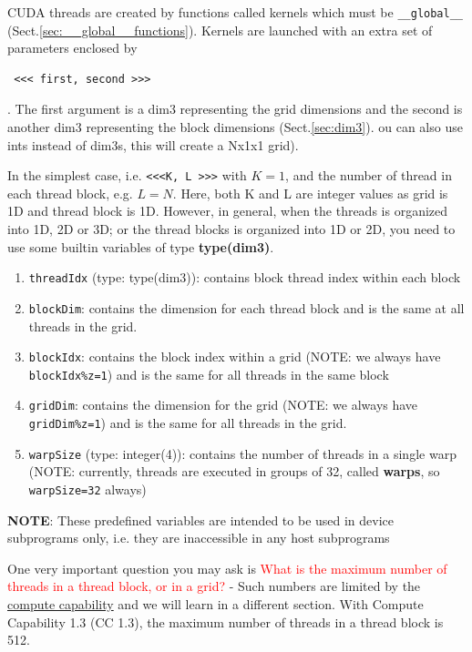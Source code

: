 CUDA threads are created by functions called kernels which must be
\verb!__global__! (Sect.\ref{sec:__global__functions}).
Kernels are launched with an extra set of parameters enclosed by
\begin{verbatim}
 <<< first, second >>>
\end{verbatim}.
The first argument is a dim3 representing the grid dimensions and the second is
another dim3 representing the block dimensions (Sect.\ref{sec:dim3}).
ou can also use ints instead of dim3s, this will create a Nx1x1 grid).



In the simplest case, i.e. \verb.<<<K, L >>>. with $K=1$, and the number of
thread in each thread block, e.g. $L=N$. Here, both K and L are integer values
as grid is 1D and thread block is 1D. However, in general, when the threads is
organized into 1D, 2D or 3D; or the thread blocks is organized into 1D or 2D,
you need to use some builtin variables of type {\bf type(dim3)}.

\begin{enumerate}
\item \verb.threadIdx. (type: type(dim3)): contains block thread index
  within each block
\item \verb.blockDim.: contains the dimension for each thread block
  and is the same at all threads in the grid.
\item \verb.blockIdx.: contains the block index within a grid (NOTE:
  we always have \verb. blockIdx%z=1.) and is the same for all threads
  in the same block
\item \verb.gridDim.: contains the dimension for the grid (NOTE: we
  always have \verb. gridDim%z=1.) and is the same for all
  threads in the grid.

\item \verb.warpSize. (type: integer(4)): contains the number of
  threads in a single warp (NOTE: currently, threads are executed in
  groups of 32, called {\bf warps}, so \verb.warpSize=32. always)
\end{enumerate} 

{\bf NOTE}: These predefined variables are intended to be used in
device subprograms only, i.e. they are inaccessible in any host
subprograms



One very important question you may ask is
\textcolor{red}{What is the maximum number of threads in a thread
  block, or in a grid?}
- Such numbers are limited by the
\hyperref[sec:compute-capability]{compute capability} and we will
learn in a different section. With Compute Capability 1.3 (CC 1.3),
the maximum number of threads in a thread block is 512.



